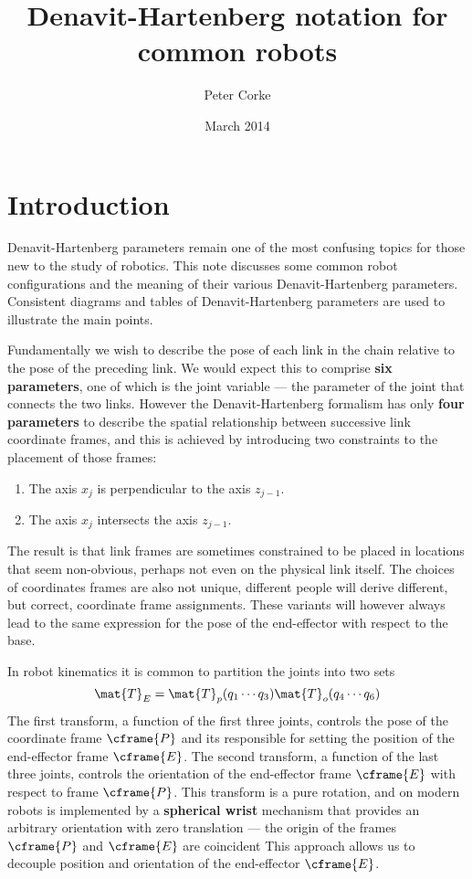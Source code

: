 \documentclass[11pt]{article}
\title{Denavit-Hartenberg notation for common robots}
\author{Peter Corke}
\date{March 2014}                                           %
\numberwithin{equation}{section}
\begin{document}
\maketitle

\section{Introduction}

Denavit-Hartenberg parameters remain one of the most confusing topics for those new to the study of robotics.
This note discusses some common robot configurations and the meaning of their various Denavit-Hartenberg parameters.
Consistent diagrams and tables of Denavit-Hartenberg parameters are used to illustrate the main points.

Fundamentally we wish to describe the pose of each link in the chain relative to the pose of the preceding link.
We would expect this to comprise \textbf{six parameters}, one of which is the joint variable --- the parameter of the joint that connects the two links.
However the Denavit-Hartenberg formalism\cite[Ch.~7]{Corke11a} has only \textbf{four parameters} to describe the spatial relationship between successive link
coordinate frames, and this is achieved by introducing two constraints\cite[p.~78]{Spong06} to the placement of those frames:
\begin{enumerate}
\item The axis $x_j$ is perpendicular to the axis $z_{j-1}$.
\item The axis $x_j$ intersects the axis $z_{j-1}$.
\end{enumerate}
The result is that link frames are sometimes constrained to be placed in locations that seem non-obvious, perhaps not even on the physical link
itself.
The choices of coordinates frames are also not unique, different people will derive different, but correct, coordinate frame assignments\cite{Spong06}.  These variants will however always lead to the same expression for the pose of the end-effector with respect to the base.

In robot kinematics it is common to partition the joints into two sets
\begin{equation}
\mat{T}_E = \mat{T}_p(q_1 \cdots q_3) \mat{T}_o(q_4 \cdots q_6) \label{eq:1}
\end{equation}
The first transform, a function of the  first three joints, controls the pose of the coordinate frame $\cframe{P}$ and its responsible for setting the position
of the end-effector frame $\cframe{E}$.
The second transform, a function of the last three joints, controls the orientation of the end-effector frame $\cframe{E}$ with respect to frame
$\cframe{P}$.  This transform is a pure rotation, and on modern robots is implemented by  a \textbf{spherical wrist} mechanism that provides an arbitrary orientation with zero translation --- the origin of the frames
$\cframe{P}$ and $\cframe{E}$ are coincident 
This  approach allows us to decouple position and orientation of the end-effector $\cframe{E}$. 
\end{document}

